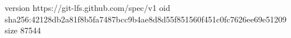 version https://git-lfs.github.com/spec/v1
oid sha256:42128db2a81f8b5fa7487bcc9b4ae8d8d55f851560f451c0fc7626ee69e51209
size 87544
